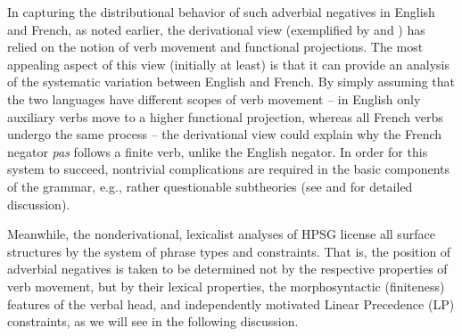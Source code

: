 \documentclass[output=paper
                ,modfonts
                		,nonflat
	        ,collection
	        ,collectionchapter
	        ,collectiontoclongg
 	        ,biblatex
                ,babelshorthands
                ,newtxmath
                ,draftmode
                ,colorlinks, citecolor=brown
]{./langsci/langscibook}
\begin{document}
{\begin{exe}
\begin{xlist}
\begin{exe}
\begin{xlist}
In capturing the distributional behavior of such adverbial negatives
in English and French, as noted earlier, the derivational view (exemplified by \citealt{Pollock:89} and \citealt{Chomsky:91})
has relied on the notion of verb
movement and functional projections.  The most appealing aspect of this
view (initially at least) is that it can provide an analysis of the
systematic variation
between English and French. By simply assuming that the
two languages have different scopes of verb movement -- in English
only auxiliary verbs move to a higher functional projection, whereas
all French verbs undergo the same process -- the derivational
view could explain why the French negator \textit{pas} follows
a finite verb, unlike the English negator.  In order for this system to succeed,
nontrivial complications are required in the basic components of the
grammar, e.g., rather questionable subtheories (see \citealt{Kim:00} and \citealt{KS:02}
for detailed discussion).

Meanwhile, the nonderivational, lexicalist analyses of HPSG
license all surface structures by the system of phrase types
and constraints.  That is, the position of
adverbial negatives is taken to be determined not by
the respective properties of verb movement, but by their lexical
properties, the morphosyntactic (finiteness) features of the verbal head,
and independently motivated Linear Precedence (LP) constraints, as
we will see in the following discussion.

\end{xlist}
\end{exe}
\end{xlist}
\end{exe}}
\end{document}
